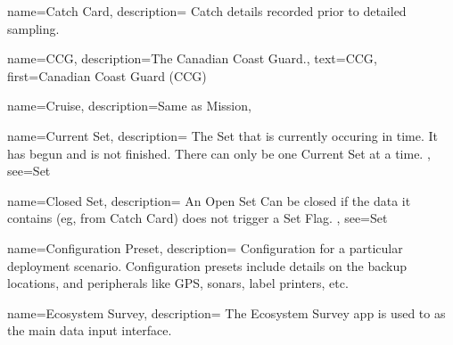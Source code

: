  {
  name=Catch Card,
  description={
    Catch details recorded prior to detailed sampling.
  }
}

 {
  name=CCG,
  description={The Canadian Coast Guard.},
  text={CCG},
  first={Canadian Coast Guard (CCG)}
}

 {
  name=Cruise,
  description={Same as \gls{Mission}},
}

 {
  name=Current Set,
  description={
    The \gls{Set} that is currently occuring in time.
    It has begun and is not finished.
    There can only be one \gls{Current Set} at a time.
  },
  see={Set}
}

 {
  name=Closed Set,
  description={
    An \gls{Open Set} Can be closed if the data it contains (eg, from \gls{Catch Card}) does not trigger a \gls{Set Flag}.
  },
  see={Set}
}

  {
  name=Configuration Preset,
  description={
    Configuration for a particular deployment scenario. Configuration presets include details on the backup locations, and peripherals like GPS, sonars, label printers, etc.
  }
}








 {
  name=Ecosystem Survey,
  description={
    The Ecosystem Survey app is used to as the main data input interface.
    }
}


